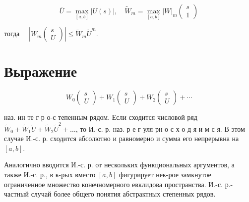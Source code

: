 \documentclass[10pt]{article}
\begin{document}
\[

\bar{U}=\max _{[a, b]}|U(s)|, \quad \tilde{W}_{m}=\max _{[a, b]}|W|_{m}\left(\begin{array}{l}

s \\

1

\end{array}\right)

\]



тогда $\quad\left|W_{m}\left(\begin{array}{l}s \\ U\end{array}\right)\right| \leqslant \tilde{W}_{m} \tilde{U}^{m}$.



\section{Выражение}

\[

W_{0}\left(\begin{array}{l}

s \\

U

\end{array}\right)+W_{1}\left(\begin{array}{l}

s \\

U

\end{array}\right)+W_{2}\left(\begin{array}{l}

s \\

U

\end{array}\right)+\cdots

\]



наз. ин те г р о-с тепенным рядом. Если сходится числовой ряд $\tilde{W}_{0}+\tilde{W}_{1} \tilde{U}+\tilde{W}_{2} \tilde{U}^{2}+\ldots$, то И.-с. р. наз. р е г уля рн о с х о д я и м с я. В этом случае И.-с. р. сходится абсолютно и равномерно и сумма его непрерывна на $[a, b]$.



Аналогично вводится И.-с. р. от нескольких функциональных аргументов, а также И.-с. р., в к-рых вместо $[a, b]$ фигурирует нек-рое замкнутое ограниченное множество конечномерного евклидова пространства. И.-с. р.- частный случай более общего понятия абстрактных степенных рядов.
\end{document}
